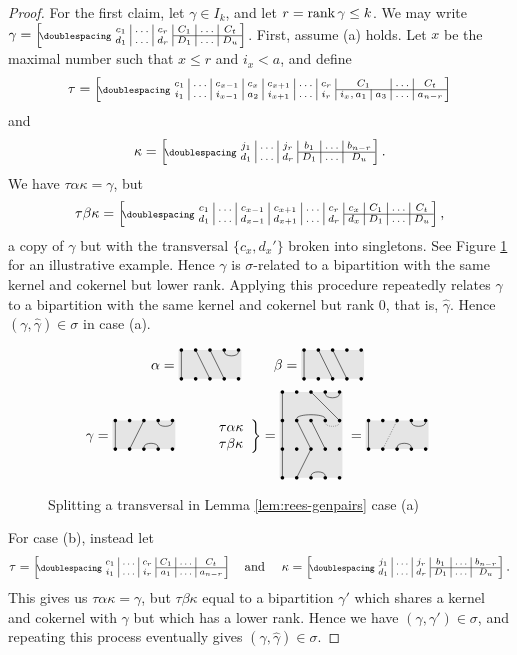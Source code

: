 \begin{lemma}
\begin{proof}
    For the first claim, let $\gamma \in I_k$, and let $r = \operatorname{rank}\gamma \leq k$.
    We may write $\gamma = \bipart{c|c|c|c|c|c}{4-6}
    {c_1 & \ldots & c_r & C_1 & \ldots & C_t}
    {d_1 & \ldots & d_r & D_1 & \ldots & D_u}$.
    First, assume (a) holds.
    Let $x$ be the maximal number such that $x \leq r$ and $i_x < a$, and define
    $$\tau = \bipart{c|c|c|c|c|c|c|c|c|c|c}{8-11}
    {c_1 & \ldots & c_{x-1} & c_x & c_{x+1} & \ldots & c_r
      & \mc2{c|}{C_1} & \ldots & C_t}
    {i_1 & \ldots & i_{x-1} & a_2 & i_{x+1} & \ldots & i_r
      & i_x, a_1 & a_3 & \ldots & a_{n-r}}$$
    and $$\kappa = \bipart{c|c|c|c|c|c}{4-6}
    {j_1 & \ldots & j_r & b_1 & \ldots & b_{n-r}}
    {d_1 & \ldots & d_r & D_1 & \ldots & D_u}.$$
    We have $\tau\alpha\kappa = \gamma$, but
    $$\tau\beta\kappa = \bipart{c|c|c|c|c|c|c|c|c|c}{7-10}
    {c_1 & \ldots & c_{x-1} & c_{x+1} & \ldots & c_r & c_x
      & C_1 & \ldots & C_t}
    {d_1 & \ldots & d_{x-1} & d_{x+1} & \ldots & d_r & d_x
      & D_1 & \ldots & D_u},$$
    a copy of $\gamma$ but with the transversal $\{c_x, d_x'\}$ broken into
    singletons.  See Figure \ref{fig:case-a-hat-example} for an illustrative
    example.  Hence $\gamma$ is $\sigma$-related to a bipartition with the same
    kernel and cokernel but lower rank.  Applying this procedure repeatedly
    relates $\gamma$ to a bipartition with the same kernel and cokernel but rank
    $0$, that is, $\widehat\gamma$.  Hence $(\gamma, \widehat\gamma) \in \sigma$
    in case (a).

    \begin{figure}[h]
      \centering
      $$
      \alpha = \bipartdiag{\tv11 \tv23 \tv34 \tc45} \qquad
      \beta = \bipartdiag{\tv11 \tv23 \tv34}
      $$
      $$
      \gamma = \bipartdiag{\tv11 \tc45 \bc34 \tv32} \qquad
      \left.
        \begin{array}{l}\tau\alpha\kappa\\ \tau\beta\kappa \end{array}
      \right\} = \triplebipartdiag{
        \uutv11\utv11\tv11
        \uutv35\uubc42\utv23\tv32
        \draw[densely dotted](5, 3.875) .. controls (5, 3.5) and (4, 3.5) .. (4, 3.875);
        \uutc45 \utv34 \bc34
      } = \bipartdiag{\tv11 \tc45 \bc34 \draw[densely dotted](3,2)--(2,0);}
      $$
      \caption{Splitting a transversal in Lemma \ref{lem:rees-genpairs} case
        (a)}
      \label{fig:case-a-hat-example}
    \end{figure}
    For case (b), instead let
    $$\tau = \bipart{c|c|c|c|c|c}{4-6}
    {c_1 & \ldots & c_r & C_1 & \ldots & C_t}
    {i_1 & \ldots & i_r & a_1 & \ldots & a_{n-r}} \text{\quad and \quad}
    \kappa = \bipart{c|c|c|c|c|c}{4-6}
    {j_1 & \ldots & j_r & b_1 & \ldots & b_{n-r}}
    {d_1 & \ldots & d_r & D_1 & \ldots & D_u}.$$
    This gives us $\tau\alpha\kappa = \gamma$, but $\tau\beta\kappa$ equal to a
    bipartition $\gamma'$ which shares a kernel and cokernel with $\gamma$ but
    which has a lower rank.  Hence we have $(\gamma, \gamma') \in \sigma$, and
    repeating this process eventually gives
    $(\gamma, \widehat\gamma) \in \sigma$.


\end{proof}
\end{lemma}
